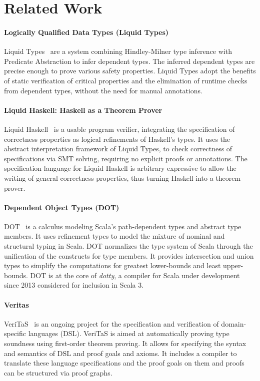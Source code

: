 \chapter{Related Work}
\label{chp:related}

\subsubsection{Logically Qualified Data Types (Liquid Types)}
Liquid Types~\cite{liquid-types} are a system
combining Hindley-Milner type inference with Predicate Abstraction
to infer dependent types.
The inferred dependent types are precise enough
to prove various safety properties.
Liquid Types adopt the benefits of
static verification of critical properties and
the elimination of runtime checks
from dependent types,
without the need for manual annotations.

\subsubsection{Liquid Haskell: Haskell as a Theorem Prover}
Liquid Haskell~\cite{liquid-haskell} is a usable
program verifier, integrating
the specification of correctness properties
as logical refinements of Haskell's types.
It uses the abstract interpretation framework of Liquid Types,
to check correctness of specifications via SMT solving,
requiring no explicit proofs or annotations.
The specification language for Liquid Haskell
is arbitrary expressive to allow
the writing of general correctness properties,
thus turning Haskell into a theorem prover.

\subsubsection{Dependent Object Types (DOT)}
DOT~\cite{dot1,dot2} is a calculus
modeling Scala's path-dependent types and abstract type members.
It uses refinement types to model the mixture of
nominal and structural typing in Scala.
DOT normalizes the type system of Scala
through the unification of the constructs for type members.
It provides intersection and union types
to simplify the computations for greatest lower-bounds
and least upper-bounds.
DOT is at the core of \textit{dotty},
a compiler for Scala under development since 2013
considered for inclusion in Scala 3.

\subsubsection{Veritas}
VeriTaS~\cite{veritas1,veritas2} is an ongoing project
for the specification and verification
of domain-specific languages (DSL).
VeriTaS is aimed at automatically proving type soundness 
using first-order theorem proving.
It allows for specifying
the syntax and semantics of DSL
and proof goals and axioms.
It includes a compiler to translate
these language specifications and the proof goals on them
and proofs can be structured via proof graphs.


